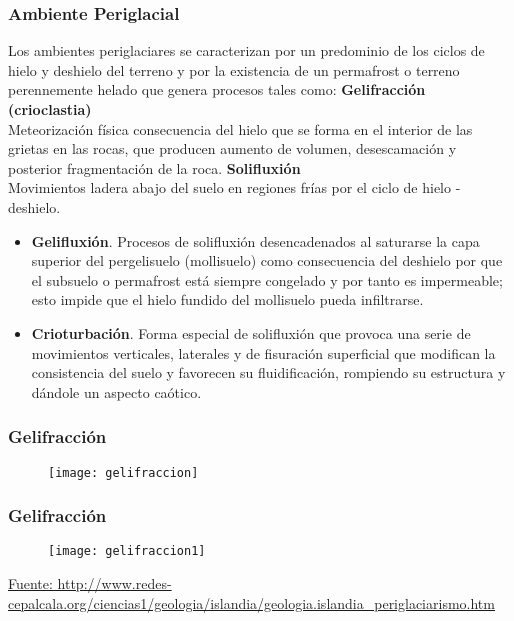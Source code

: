 \documentclass{beamer}
\begin{document}
\begin{frame}
\frametitle{Ambiente Periglacial}
\justifying
\small{
Los ambientes periglaciares se caracterizan por un predominio de los ciclos de hielo y deshielo del terreno y por la existencia de un permafrost o terreno perennemente helado que genera procesos tales como:\vfill
\textbf{Gelifracción (crioclastia)}\\
Meteorización física consecuencia del hielo que se forma en el interior de las grietas en las rocas, que producen aumento de volumen, desescamación y posterior fragmentación de la roca.\vfill
\textbf{Solifluxión}\\
Movimientos ladera abajo del suelo en regiones frías por el ciclo de hielo -deshielo.\vfill
\begin{itemize}
\item \textbf{Gelifluxión}.
Procesos de solifluxión desencadenados al saturarse la capa superior del pergelisuelo (mollisuelo) como consecuencia del deshielo por que el subsuelo o permafrost está siempre congelado y por tanto es impermeable; esto impide que el hielo fundido del mollisuelo pueda infiltrarse.\\
\item \textbf{Crioturbación}.
Forma especial de solifluxión que provoca una serie de movimientos verticales, laterales y de fisuración superficial que modifican la consistencia del suelo y favorecen su fluidificación, rompiendo su estructura y dándole un aspecto caótico.
\end{itemize}
}
\end{frame}
\begin{frame}
\frametitle{Gelifracción}
\begin{figure}
\begin{center}
\texttt{[image: gelifraccion]}
\end{center}
\end{figure}
\end{frame}
\begin{frame}
\frametitle{Gelifracción}
\begin{figure}
\begin{center}
\texttt{[image: gelifraccion1]}
\end{center}
\end{figure}
\tiny{\url{Fuente: http://www.redes-cepalcala.org/ciencias1/geologia/islandia/geologia.islandia_periglaciarismo.htm}}
\end{frame}
\end{document}
